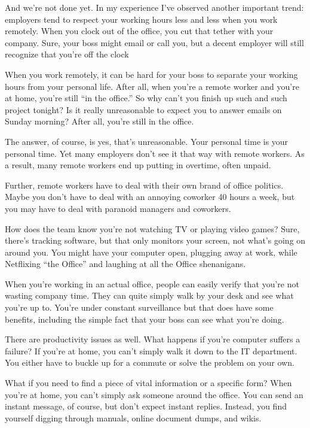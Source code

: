 \documentclass{main}
\begin{document}
And we're not done yet. In my experience I've observed another important trend:
employers tend to respect your working hours less and less when you work
remotely. When you clock out of the office, you cut that tether with your
company. Sure, your boss might email or call you, but a decent employer will
still recognize that you're off the clock

When you work remotely, it can be hard for your boss to separate your working
hours from your personal life. After all, when you're a remote worker and you're
at home, you're still ``in the office.'' So why can't you finish up such and such
project tonight? Is it really unreasonable to expect you to answer emails on
Sunday morning? After all, you're still in the office.

The answer, of course, is yes, that's unreasonable. Your personal time is your
personal time. Yet many employers don't see it that way with remote workers. As
a result, many remote workers end up putting in overtime, often unpaid.

Further, remote workers have to deal with their own brand of office politics.
Maybe you don't have to deal with an annoying coworker 40 hours a week, but you
may have to deal with paranoid managers and coworkers.

How does the team know you're not watching TV or playing video games? Sure,
there's tracking software, but that only monitors your screen, not what's going
on around you. You might have your computer open, plugging away at work, while
Netflixing ``the Office'' and laughing at all the Office shenanigans.

When you're working in an actual office, people can easily verify that you're
not wasting company time. They can quite simply walk by your desk and see what
you're up to. You're under constant surveillance but that does have some
benefits, including the simple fact that your boss can see what you're doing.

There are productivity issues as well. What happens if you're computer suffers a
failure? If you're at home, you can't simply walk it down to the IT department.
You either have to buckle up for a commute or solve the problem on your own.

What if you need to find a piece of vital information or a specific form? When
you're at home, you can't simply ask someone around the office. You can send an
instant message, of course, but don't expect instant replies. Instead, you find
yourself digging through manuals, online document dumps, and wikis.
\end{document}
